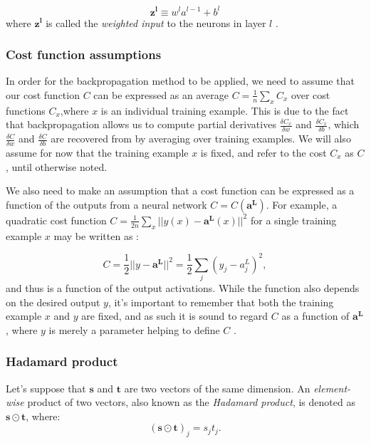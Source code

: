 \begin{equation}
\label{notation:3}
\boldsymbol{z^l} \equiv w^la^{l-1} + b^l
\end{equation}
where $\boldsymbol{z^l}$ is called the \emph{weighted input} to the neurons in layer $l$ \cite{backpropagation_nielsen}.

\subsubsection{Cost function assumptions}

In order for the backpropagation method to be applied, we need to assume that our cost function $C$ can be expressed as an average $C = \frac{1}{n}\sum_x C_x$ over cost functions $C_x$,where $x$ is an individual training example. This is due to the fact that backpropagation allows us to compute partial derivatives $\frac{\delta C_x}{\delta w}$ and $\frac{\delta C_x}{\delta b}$, which $\frac{\delta C}{\delta w}$ and $\frac{\delta C}{\delta b}$ are recovered from by averaging over training examples. We will also assume for now that the training example $x$ is fixed, and refer to the cost $C_x$ as $C$, until otherwise noted.

We also need to make an assumption that a cost function can be expressed as a function of the outputs from a neural network $C = C(\boldsymbol{a^L})$. For example, a quadratic cost function $C = \frac{1}{2n} \sum_x ||y(x) - \boldsymbol{a^L}(x)||^2$ for a single training example $x$ may be written as :

\begin{equation}
\label{assumptions:1}
C = \frac{1}{2}||y-\boldsymbol{a^L}||^2 = \frac{1}{2} \sum_j (y_j - a_j^L)^2,
\end{equation}
and thus is a function of the output activations. While the function also depends on the desired output $y$, it's important to remember that both the training example $x$ and $y$ are fixed, and as such it is sound to regard $C$ as a function of $\boldsymbol{a^L}$, where $y$ is merely a parameter helping to define $C$ \cite{backpropagation_nielsen}.

\subsubsection{Hadamard product}

Let's suppose that $\boldsymbol{s}$ and $\boldsymbol{t}$ are two vectors of the same dimension. An \emph{element-wise} product of two vectors, also known as the \emph{Hadamard product}, is denoted as $\boldsymbol{s} \odot \boldsymbol{t}$, where: 
\begin{equation}
\label{hadamard:1}
(\boldsymbol{s} \odot \boldsymbol{t})_j = s_jt_j.
\end{equation}
